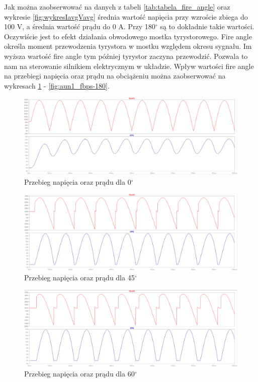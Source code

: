 \documentclass[11pt]{article}
\begin{document}
Jak można zaobserwować na danych z tabeli \ref{tab:tabela_fire_angle} oraz wykresie \ref{fig:wykresIavgVavg} średnia wartość napięcia przy wzroście zbiega do 100 V, a średnia wartość prądu do 0 A. Przy 180$^{\circ}$ są to dokładnie takie wartości. Oczywiście jest to efekt działania obwodowego mostka tyrystorowego. Fire angle określa moment przewodzenia tyrystora w mostku względem okresu sygnału. Im wyższa wartość fire angle tym później tyrystor zaczyna przewodzić. Pozwala to nam na sterowanie silnikiem elektrycznym w układzie. Wpływ wartości fire angle na przebiegi napięcia oraz prądu na obciążeniu można zaobserwować na wykresach \ref{fig:aun1_fbps-0} - \ref{fig:aun1_fbps-180}.
\begin{figure}[H]
    \centering
    \includegraphics[width=1\linewidth]{aun1_fbps-0.png}
    \caption{Przebieg napięcia oraz prądu dla 0$^{\circ}$}
    \label{fig:aun1_fbps-0}
\end{figure}
\begin{figure}[H]
    \centering
    \includegraphics[width=1\linewidth]{aun1_fbps-45.png}
    \caption{Przebieg napięcia oraz prądu dla 45$^{\circ}$}
    \label{fig:aun1_fbps-45}
\end{figure}
\begin{figure}[H]
    \centering
    \includegraphics[width=1\linewidth]{aun1_fbps-60.png}
    \caption{Przebieg napięcia oraz prądu dla 60$^{\circ}$}
    \label{fig:aun1_fbps-60}
\end{figure}
\end{document}
